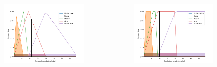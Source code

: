 \documentclass[aspectratio=169]{beamer} %
\begin{document}
{{{{{{{\begin{frame}
\begin{flushright}
\begin{columns}
        \centering
         \begin{figure}
		\centering
		\includegraphics[scale=0.4]{images/COT_Victoria_triangular.png}
	\end{figure}
	     	
        \centering
         \begin{figure}
		\centering
		\includegraphics[scale=0.4]{images/COT_Victoria_trapezoidal.png}
	\end{figure}
    \end{columns}

\end{flushright}

\end{frame} }


}}}}}}
\end{document}
